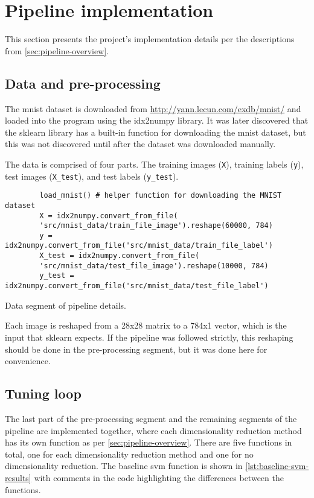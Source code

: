 \section{Pipeline implementation}\label{sec:pipeline-implementation}
This section presents the project's implementation details per the descriptions from \autoref{sec:pipeline-overview}.

\subsection{Data and pre-processing}\label{subsec:data-and-pre-processing}
The \gls{mnist} dataset is downloaded from \url{http://yann.lecun.com/exdb/mnist/}\cite{lecun-mnist-database} and loaded into the program using the idx2numpy library. It was later discovered that the \gls{sklearn} library has a built-in function for downloading the \gls{mnist} dataset, but this was not discovered until after the dataset was downloaded manually.

The data is comprised of four parts. The training images (\texttt{X}), training labels (\texttt{y}), test images (\texttt{X\_test}), and test labels (\texttt{y\_test}).


\begin{listing}[htb!]
    \centering
    \begin{verbatim}
        load_mnist() # helper function for downloading the MNIST dataset
        X = idx2numpy.convert_from_file(
        'src/mnist_data/train_file_image').reshape(60000, 784)
        y = idx2numpy.convert_from_file('src/mnist_data/train_file_label')
        X_test = idx2numpy.convert_from_file(
        'src/mnist_data/test_file_image').reshape(10000, 784)
        y_test = idx2numpy.convert_from_file('src/mnist_data/test_file_label')
    \end{verbatim}
    \caption{Data segment of pipeline details.}
    \label{lst:data-segment}
\end{listing}


Each image is reshaped from a 28x28 matrix to a 784x1 vector, which is the input that \gls{sklearn} expects. If the pipeline was followed strictly, this reshaping should be done in the pre-processing segment, but it was done here for convenience.

\subsection{Tuning loop}\label{subsec:tuning-loop}
The last part of the pre-processing segment and the remaining segments of the pipeline are implemented together, where each dimensionality reduction method has its own function as per \autoref{sec:pipeline-overview}. There are five functions in total, one for each dimensionality reduction method and one for no dimensionality reduction. The baseline \gls{svm} function is shown in \autoref{lst:baseline-svm-results} with comments in the code highlighting the differences between the functions.


